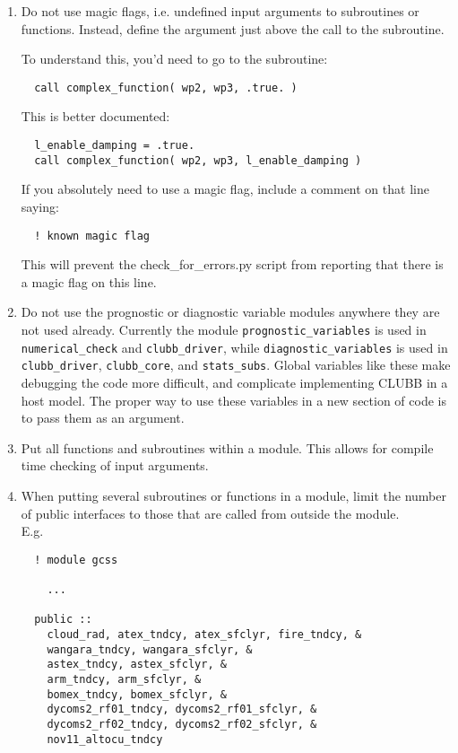 \documentclass[letterpaper,12pt]{article}
\begin{document}
\begin{enumerate}
\item  Do not use magic flags, i.e. undefined input arguments to subroutines or 
functions.  Instead, define the argument just above the call to the subroutine.

To understand this, you'd need to go to the subroutine: 
\begin{verbatim}
  call complex_function( wp2, wp3, .true. ) 
\end{verbatim}

This is better documented:
\begin{verbatim}
  l_enable_damping = .true.
  call complex_function( wp2, wp3, l_enable_damping )
\end{verbatim}

If you absolutely need to use a magic flag, include a comment on that line
saying:
\begin{verbatim}
  ! known magic flag
\end{verbatim}
This will prevent the check\_for\_errors.py script from reporting that there is a
magic flag on this line.

\item Do not use the prognostic or diagnostic variable modules anywhere they
are not used already.  Currently the module \texttt{prognostic\_variables} 
is used in 
\texttt{numerical\_check} and \texttt{clubb\_driver}, while 
\texttt{diagnostic\_variables} is used in \texttt{clubb\_driver}, 
\texttt{clubb\_core}, 
and \texttt{stats\_subs}. Global variables like these make debugging 
the code more difficult, and complicate implementing CLUBB in a host model.
The proper way to use these variables in a new section of code is to pass them as an argument.
\newline

\item Put all functions and subroutines within a module.  This allows for 
compile time checking of input arguments. \newline

\item When putting several subroutines or functions in a module, limit the
 number of public interfaces to those that are called from outside the 
 module.\\
E.g. 
\begin{verbatim}
  ! module gcss

    ...

  public ::
    cloud_rad, atex_tndcy, atex_sfclyr, fire_tndcy, &
    wangara_tndcy, wangara_sfclyr, &
    astex_tndcy, astex_sfclyr, &
    arm_tndcy, arm_sfclyr, &
    bomex_tndcy, bomex_sfclyr, &
    dycoms2_rf01_tndcy, dycoms2_rf01_sfclyr, &
    dycoms2_rf02_tndcy, dycoms2_rf02_sfclyr, &
    nov11_altocu_tndcy 


\end{verbatim}
\end{enumerate}
\end{document}
